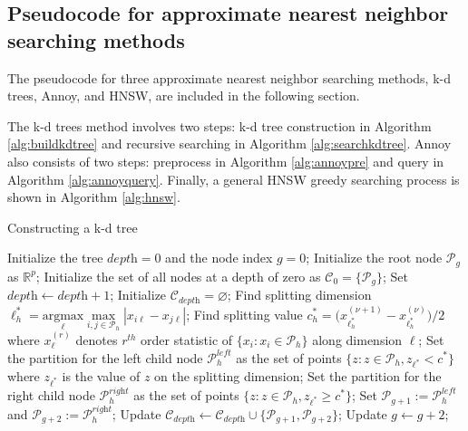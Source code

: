 \documentclass[11pt,a4paper,]{article}
\begin{document}
\clearpage
\FloatBarrier

\subsection{Pseudocode for approximate nearest neighbor searching methods}
\label{sec:annalg}
The pseudocode for three approximate nearest neighbor searching methods, k-d trees, Annoy, and HNSW, are included in the following section.

The k-d trees method involves two steps: k-d tree construction in Algorithm \ref{alg:buildkdtree} and recursive searching in Algorithm \ref{alg:searchkdtree}.
Annoy also consists of two steps: preprocess in Algorithm \ref{alg:annoypre} and query in Algorithm \ref{alg:annoyquery}.
Finally, a general HNSW greedy searching process is shown in Algorithm \ref{alg:hnsw}.

\begin{algorithm}[!htb]
  \caption{Constructing a k-d tree}
  \label{alg:buildkdtree}
  \begin{algorithmic}[1]
    \STATE Initialize the tree $\textit{depth}=0$ and the node index $g=0$;
    \STATE Initialize the root node $\mathcal{P}_g$ as $\mathbb{R}^p$;
    \STATE Initialize the set of all nodes at a depth of zero as $\mathcal{C}_0=\{\mathcal{P}_g\}$;
      \STATE Set $\textit{depth}\leftarrow \textit{depth}+1$;
      \STATE Initialize $\mathcal{C}_{\textit{depth}}=\varnothing$;
        \STATE Find splitting dimension $\ell_h^*=\underset{\ell}{\textrm{argmax}}\underset{i,j\in\mathcal{P}_h}{\max}|x_{i\ell}-x_{j\ell}|$;
        \STATE Find splitting value $c_h^*=\big(x^{(\nu+1)}_{{\ell_h^*}}-x^{(\nu)}_{{\ell_h^*}}\big)/2$ where $x^{(r)}_{\ell}$ denotes $r^{th}$ order statistic of $\{x_i:x_{i}\in\mathcal{P}_h\}$ along dimension $\ell$;
        \STATE Set the partition for the left child node $\mathcal{P}^{\textit{left}}_h$ as the set of points $\{z:z\in\mathcal{P}_h, z_{\ell^*}<c^*\}$ where $z_{\ell^*}$ is the value of $z$ on the splitting dimension;
        \STATE Set the partition for the right child node $\mathcal{P}^{\textit{right}}_h$ as the set of points $\{z:z\in\mathcal{P}_h, z_{\ell^*}\geq c^*\}$;
        \STATE Set $\mathcal{P}_{g+1}:=\mathcal{P}_h^{\textit{left}}$ and $\mathcal{P}_{g+2}:=\mathcal{P}_h^{\textit{right}}$;
        \STATE Update $\mathcal{C}_{\textit{depth}}\leftarrow\mathcal{C}_{\textit{depth}}\cup\{\mathcal{P}_{g+1},\mathcal{P}_{g+2}\}$;
        \STATE Update $g\leftarrow g+2$;
      \ENDFOR
    \ENDWHILE
  \end{algorithmic}
\end{algorithm}
\end{document}
